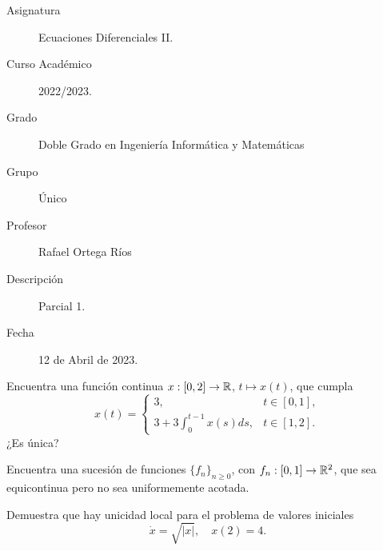\documentclass[12pt]{article}
\begin{document}

    
    

    \begin{description}
        \item[Asignatura] Ecuaciones Diferenciales II.
        \item[Curso Académico] 2022/2023.
        \item[Grado] Doble Grado en Ingeniería Informática y Matemáticas
        \item[Grupo] Único
        \item[Profesor] Rafael Ortega Ríos
        \item[Descripción] Parcial 1.
        \item[Fecha] 12 de Abril de 2023.
    
    \end{description}
    \newpage


    
    \begin{ejercicio}
        Encuentra una función continua $x : [0, 2] \to \mathbb{R}$, $t \mapsto x(t)$, que cumpla
        \begin{equation*}
            x(t) = \begin{cases}
                3, & t \in [0, 1],\\
                \displaystyle 3 + 3 \int_{0}^{t-1} x(s)ds, & t \in [1, 2].
            \end{cases}
        \end{equation*}
        ¿Es única?
    \end{ejercicio}

    \begin{ejercicio}
        Encuentra una sucesión de funciones $\{f_n\}_{n \geq 0}$, con $f_n : [0, 1] \to \mathbb{R}^2$, que sea equicontinua pero no sea uniformemente acotada.
    \end{ejercicio}

    \begin{ejercicio}
        Demuestra que hay unicidad local para el problema de valores iniciales
        \[
            \dot{x} = \sqrt{|x|}, \quad x(2) = 4.
        \]
    \end{ejercicio}
\end{document}
